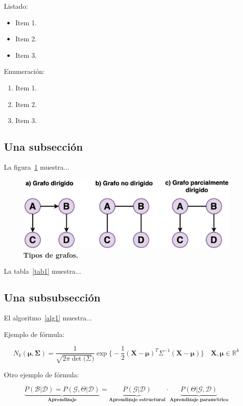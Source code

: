 Listado:
\begin{itemize}
  \item Item 1.
  \item Item 2.
  \item Item 3.
\end{itemize}

Enumeración:
\begin{enumerate}
  \item Item 1.
  \item Item 2.
  \item Item 3.
\end{enumerate}

\subsection{Una subsección}
\label{una-subseccion}

La figura~\ref{fig1} muestra...

\begin{figure}[ht!]
    \centering
    \includegraphics[scale=0.15]{figuras/fig1.png}
    \caption[Tipos de grafos]{\textbf{Tipos de grafos.}}
    \label{fig1}
\end{figure}

La tabla~\ref{tab1} muestra...



\subsection{Una subsubsección}
\label{una-subsubseccion}

El algoritmo~\ref{alg1} muestra...
\medskip



\newpage

Ejemplo de fórmula:

\begin{equation*}
    N_{k}(\mathbf{\mu},\mathbf{\Sigma}) = \frac{1}{\sqrt{2\pi\det(\Sigma})} \exp \bigg\{ -\frac{1}{2}(\mathbf{X}-\mathbf{\mu})^{T}\Sigma^{-1}(\mathbf{X}-\mathbf{\mu}) \bigg\} \quad \mathbf{X},\mathbf{\mu} \in \mathbb{R}^{k}
\end{equation*}

Otro ejemplo de fórmula:

\begin{equation*}
    \underbrace{P(\mathcal{B}|\mathcal{D}) = P(\mathcal{\mathcal{G}},\Theta|\mathcal{D})}_{\textbf{Aprendizaje}} = \underbrace{P(\mathcal{G}|\mathcal{D})}_{\textbf{Aprendizaje estructural}} \cdot \underbrace{P(\Theta|\mathcal{G},\mathcal{D})}_{\textbf{Aprendizaje paramétrico}}
\end{equation*}
